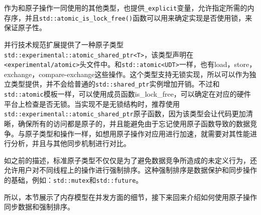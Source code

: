 作为和原子操作一同使用的其他类型，也提供\texttt{\_explicit}变量，允许指定所需的内存序，并且\texttt{std::atomic\_is\_lock\_free()}函数可以用来确定实现是否使用锁，来保证原子性。

并行技术规范扩展提供了一种原子类型\texttt{std::experimental::atomic\_shared\_ptr<T>}，该类型声明在\texttt{<experimental/atomic>}头文件中。和\texttt{std::atomic<UDT>}一样，也有load，store，exchange，compare-exchange这些操作。这个类型支持无锁实现，所以可以作为独立类型提供，并不会给普通的\texttt{std::shared\_ptr}实例增加开销。不过和\texttt{std::atomic}模板一样，可以使用成员函数is\_lock\_free，可以确定在对应的硬件平台上检查是否无锁。当实现不是无锁结构时，推荐使用\texttt{std::experimental::atomic\_shared\_ptr}原子函数，因为该类型会让代码更加清晰，确保所有的访问都是原子的，并且能避免由于忘记使用原子函数导致的数据竞争。与原子类型和操作一样，如想用原子操作对应用进行加速，就需要对其性能进行分析，并且与其他同步机制进行对比。

如之前的描述，标准原子类型不仅仅是为了避免数据竞争所造成的未定义行为，还允许用户对不同线程上的操作进行强制排序。这种强制排序是数据保护和同步操作的基础，例如：\texttt{std::mutex}和\texttt{std::future}。

所以，本节展示了内存模型在并发方面的细节，接下来回来介绍如何使用原子操作同步数据和强制排序。